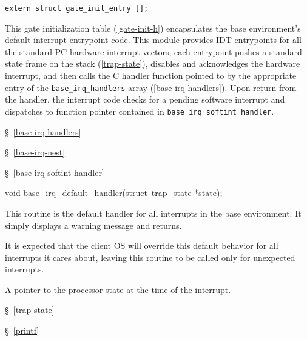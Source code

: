 \label{base-irq-inittab}
\begin{apisyn}

	{\tt extern struct gate_init_entry [];}
\end{apisyn}
\begin{apidesc}
	This gate initialization table (\ref{gate-init-h})
	encapsulates the base environment's default interrupt entrypoint code.
	This module provides IDT entrypoints
	for all the standard PC hardware interrupt vectors;
	each entrypoint pushes a standard state frame on the stack
	(\ref{trap-state}),
	disables and acknowledges the hardware interrupt,
	and then calls the C handler function pointed to
	by the appropriate entry of the {\tt base_irq_handlers} array
	(\ref{base-irq-handlers}).
	Upon return from the handler, the interrupt code checks for a pending
	software interrupt and dispatches to function pointer contained in
        {\tt base_irq_softint_handler}.
\end{apidesc}
\begin{apidep}
	\item[base_irq_handlers]	\S~\ref{base-irq-handlers}
	\item[base_irq_nest]		\S~\ref{base-irq-nest}
	\item[base_irq_softint_handler]	\S~\ref{base-irq-softint-handler}
\end{apidep}

\label{base-irq-default-handler}
\begin{apisyn}

	\funcproto void base_irq_default_handler(struct~trap_state *state);
\end{apisyn}
\begin{apidesc}
	This routine is the default handler for all interrupts in the base
	environment.  It simply displays a warning message and returns.

	It is expected that the client OS will override this default
	behavior for all interrupts it cares about, leaving this routine
	to be called only for unexpected interrupts.
\end{apidesc}
\begin{apiparm}
	\item[state]
		A pointer to the processor state at the time of the interrupt.
\end{apiparm}
\begin{apidep}
	\item[struct trap_state]	\S~\ref{trap-state}
	\item[printf]			\S~\ref{printf}
\end{apidep}

